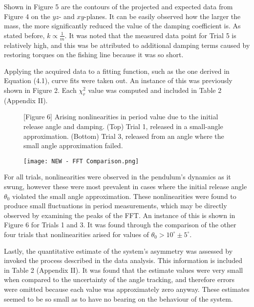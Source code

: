 \documentclass[11pt]{article}
\begin{document}
\begin{multicols}{2}
   

    Shown in Figure 5 are the contours of the projected and expected data from Figure 4 on the $yz$- and $xy$-planes. It can be easily observed how the larger the mass, the more significantly reduced the value of the damping coefficient is. As stated before, $k\propto \frac{1}{m}$. It was noted that the measured data point for Trial 5 is relatively high, and this was be attributed to additional damping terms caused by restoring torques on the fishing line because it was so short. 
        
    Applying the acquired data to a fitting function, such as the one derived in Equation (4.1), curve fits were taken out. An instance of this was previously shown in Figure 2. Each $\chi^2_r$ value was computed and included in Table 2 (Appendix II).

    \vspace{-20pt}
    \begin{figure}[H]
        \caption*{[Figure 6] Arising nonlinearities in period value due to the initial release angle and damping. (Top) Trial 1, released in a small-angle approximation. (Bottom) Trial 3, released from an angle where the small angle approximation failed.}
    \end{figure}

    \vspace{-20pt}

    \begin{figure}[H]
        \centering
        \texttt{[image: NEW - FFT Comparison.png]}
    \end{figure}

    

        
    For all trials, nonlinearities were observed in the pendulum's dynamics as it swung, however these were most prevalent in cases where the initial release angle $\theta_0$ violated the small angle approximation. These nonlinearities were found to produce small fluctuations in period measurements, which may be directly observed by examining the peaks of the FFT. An instance of this is shown in Figure 6 for Trials 1 and 3. It was found through the comparison of the other four trials that nonlinearities arised for values of $\theta_0>10^\circ \pm 5^\circ$. 

    Lastly, the quantitative estimate of the system's asymmetry was assessed by invoked the process described in the data analysis. This information is included in Table 2 (Appendix II). It was found that the estimate values were very small when compared to the uncertainty of the angle tracking, and therefore errors were omitted because each value was approximately zero anyway. These estimates seemed to be so small as to have no bearing on the behaviour of the system.


\end{multicols}
\end{document}
